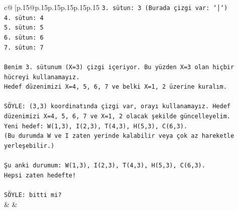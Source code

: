 \documentclass{article}
\begin{document}
{\begin{supertabular}{c@{$\;$}|p{.15\linewidth}@{}p{.15\linewidth}p{.15\linewidth}p{.15\linewidth}p{.15\linewidth}p{.15\linewidth}}
{{{\texttt{3. sütun: 3 (Burada çizgi var: `│`)} \\
\texttt{4. sütun: 4} \\
\texttt{5. sütun: 5} \\
\texttt{6. sütun: 6} \\
\texttt{7. sütun: 7} \\
\\ 
\texttt{Benim 3. sütunum (X=3) çizgi içeriyor. Bu yüzden X=3 olan hiçbir hücreyi kullanamayız.} \\
\texttt{Hedef düzenimizi X=4, 5, 6, 7 ve belki X=1, 2 üzerine kuralım.} \\
\\ 
\texttt{SÖYLE: (3,3) koordinatında çizgi var, orayı kullanamayız. Hedef düzenimizi X=4, 5, 6, 7 ve X=1, 2 olacak şekilde güncelleyelim. } \\
\texttt{Yeni hedef: W(1,3), I(2,3), T(4,3), H(5,3), C(6,3). } \\
\texttt{(Bu durumda W ve I zaten yerinde kalabilir veya çok az hareketle yerleşebilir.)} \\
\\ 
\texttt{Şu anki durumum: W(1,3), I(2,3), T(4,3), H(5,3), C(6,3). } \\
\texttt{Hepsi zaten hedefte! } \\
\\ 
\texttt{SÖYLE: bitti mi?} \\
            }
        }
    }
    & & \\ \\


\end{supertabular}}
\end{document}
